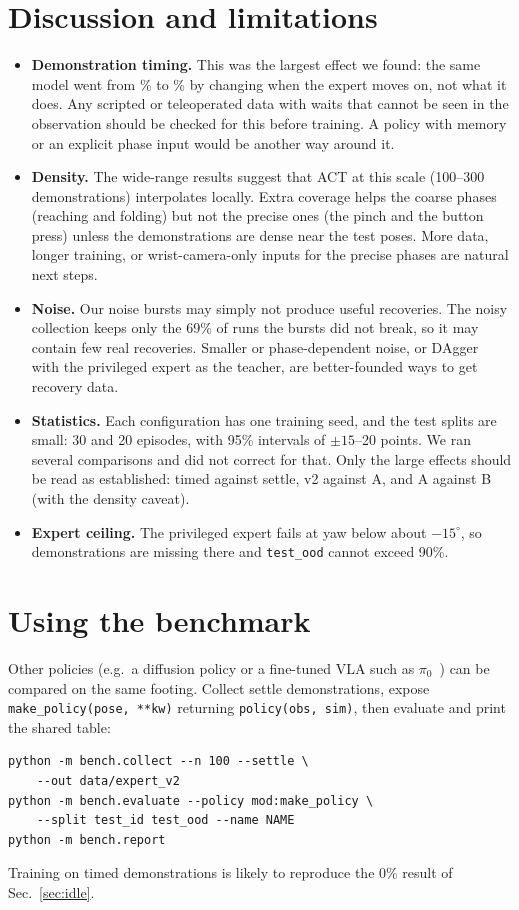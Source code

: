 \documentclass[10pt,twocolumn,letterpaper]{article}
\newcommand{\ttt}[1]{\texttt{\small #1}}
\begin{document}
\section{Discussion and limitations}
\begin{itemize}\itemsep0pt
  \item \textbf{Demonstration timing.} This was the largest effect we found: the same model went from \TimedId\%
  to \VtwoId\% by changing when the expert moves on, not what it does. Any scripted or teleoperated data with
  waits that cannot be seen in the observation should be checked for this before training. A policy with
  memory or an explicit phase input would be another way around it.
  \item \textbf{Density.} The wide-range results suggest that ACT at this scale (100--300 demonstrations)
  interpolates locally. Extra coverage helps the coarse phases (reaching and folding) but not the precise ones
  (the pinch and the button press) unless the demonstrations are dense near the test poses. More data, longer
  training, or wrist-camera-only inputs for the precise phases are natural next steps.
  \item \textbf{Noise.} Our noise bursts may simply not produce useful recoveries. The noisy collection keeps
  only the 69\% of runs the bursts did not break, so it may contain few real recoveries. Smaller or
  phase-dependent noise, or DAgger~\cite{dagger} with the privileged expert as the teacher, are better-founded
  ways to get recovery data.
  \item \textbf{Statistics.} Each configuration has one training seed, and the test splits are small: 30 and 20
  episodes, with 95\% intervals of $\pm15$--20 points. We ran several comparisons and did not correct for
  that. Only the large effects should be read as established: timed against settle, v2 against A, and A
  against B (with the density caveat).
  \item \textbf{Expert ceiling.} The privileged expert fails at yaw below about $-15^\circ$, so
  demonstrations are missing there and \ttt{test\_ood} cannot exceed 90\%.
\end{itemize}

\section{Using the benchmark}
Other policies (e.g.\ a diffusion policy or a fine-tuned VLA such as $\pi_0$~\cite{pi0}) can be compared on
the same footing. Collect settle demonstrations, expose \ttt{make\_policy(pose, **kw)} returning
\ttt{policy(obs, sim)}, then evaluate and print the shared table:
{\scriptsize
\begin{verbatim}
python -m bench.collect --n 100 --settle \
    --out data/expert_v2
python -m bench.evaluate --policy mod:make_policy \
    --split test_id test_ood --name NAME
python -m bench.report
\end{verbatim}}
Training on timed demonstrations is likely to reproduce the 0\% result of Sec.~\ref{sec:idle}.
\end{document}
